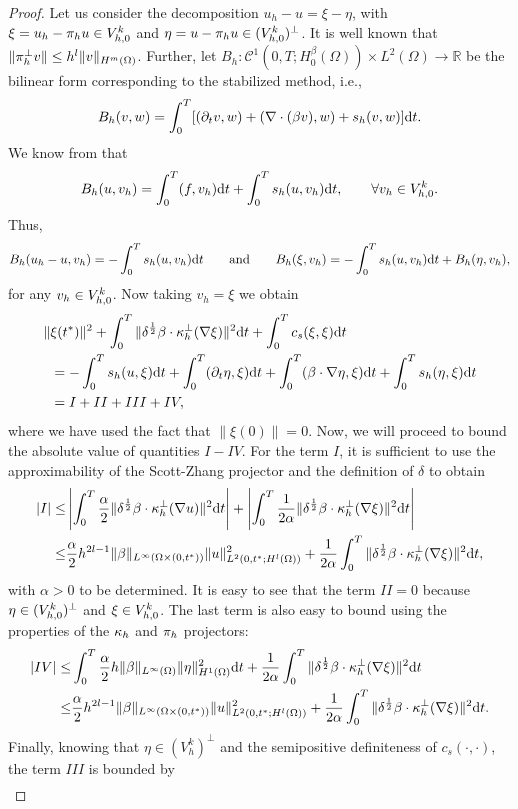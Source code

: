 \begin{proof}
Let us consider the decomposition $u_h - u = \xi - \eta$, with $\xi = u_h - \pi_{h}{u} \in V^k_{h,0}$ and $\eta = u - \pi_{h}{u}  \in (V^k_{h,0})^\perp$. It is well known that $\| \pi_{h}^\perp{v}\| \leq h^l \| v \|_{H^m(\Omega)}$. Further, let $B_h:\mathcal{C}^1(0,T;H_0^\beta(\Omega))\times L^2(\Omega) \longrightarrow \mathbb{R}$ be the bilinear form corresponding to the stabilized method, i.e., 
$$B_h(v,w) = \displaystyle\int_0^T [(\partial_t v,w) +   (\nabla \cdot (\beta v),w) + s_h(v,w)] {\rm d}t.$$ 
We know from  that 
$$B_h(u,v_h) =\displaystyle\int_0^T (f,v_h) {\rm d}t + \displaystyle\int_0^T s_h(u,v_h) {\rm d}t,\qquad \forall v_h\in V^k_{h,0}.$$
Thus,  
$$B_h(u_h-u,v_h) = -\displaystyle\int_0^T  s_h(u,v_h) {\rm d}t \qquad \hbox{and} \qquad B_h(\xi,v_h) =- \displaystyle\int_0^T  s_h(u,v_h) {\rm d}t + B_h(\eta,v_h),$$ 
for any $v_h\in V^k_{h,0}$. Now taking $v_h = \xi$ we obtain
\begin{align*}
 \|&\xi(t^*)\|^2  + \displaystyle\int_0^T \| \delta^\frac{1}{2} \beta \cdot \kappa_h^\perp (\nabla \xi) \|^2  {\rm d}t  +\displaystyle\int_0^T c_s(\xi,\xi) {\rm d}t \nonumber \\ &=  - \displaystyle\int_0^T s_h(u,\xi) {\rm d}t + \displaystyle\int_0^T (\partial_t \eta, \xi) {\rm d}t + \displaystyle\int_0^T (\beta\cdot \nabla \eta,\xi) {\rm d}t + \displaystyle\int_0^T s_h(\eta,\xi) {\rm d}t \nonumber \\ & =  I + II + III + IV,
\end{align*}
where we have used the fact that $\|\xi(0)\| = 0$. Now, we will proceed to bound the absolute value of quantities $I-IV$. For the term $I$, it is sufficient to use the approximability of the Scott-Zhang projector and the definition of $\delta$ to obtain
\begin{align*}
|I| \leq & \left| \displaystyle\int_0^T \frac{\alpha}{2} \| \delta^\frac{1}{2} \beta \cdot \kappa_h^\perp (\nabla u) \|^2 {\rm d}t\right| + 
 \left| \displaystyle\int_0^T \frac{1}{2\alpha} \| \delta^\frac{1}{2} \beta \cdot \kappa_h^\perp (\nabla \xi) \|^2 {\rm d}t \right| \\
 \leq & \frac{\alpha}{2} h^{2l-1} \|\beta\|_{L^\infty(\Omega \times (0,t^*))} \|u\|^2_{L^2(0,t^*;H^l(\Omega))} + \frac{1}{2\alpha} \displaystyle\int_0^T \| \delta^\frac{1}{2} \beta \cdot \kappa_h^\perp (\nabla \xi) \|^2  {\rm d}t,
\end{align*}
with $\alpha >0 $ to be determined. It is easy to see that the term $II=0$ because $\eta\in (V^k_{h,0})^\perp$ and $\xi\in V^k_{h,0}$. The last term is also easy to bound using the properties of the $\kappa_h$ and $\pi_{h}$ projectors:
\begin{align*}
|IV| \leq & \displaystyle\int_0^T \frac{\alpha}{2} h \|\beta\|_{L^\infty(\Omega)} \|\eta\|^2_{H^1(\Omega)}  {\rm d}t +  \frac{1}{2\alpha} \displaystyle\int_0^T \| \delta^\frac{1}{2} \beta \cdot \kappa_h^\perp (\nabla \xi) \|^2  {\rm d}t\\
\leq & \frac{\alpha}{2} h^{2l-1} \|\beta\|_{L^\infty(\Omega \times (0,t^*))}  \|u\|^2_{L^2(0,t^*;H^l(\Omega))} + \frac{1}{2\alpha} \displaystyle\int_0^T \| \delta^\frac{1}{2} \beta \cdot \kappa_h^\perp (\nabla \xi) \|^2  {\rm d}t.
\end{align*}
Finally, knowing that $\eta \in (V^k_h)^\perp$ and the semipositive definiteness of $c_s(\cdot,\cdot)$, the term $III$ is bounded by
\begin{align*}

\end{align*}
\end{proof}
